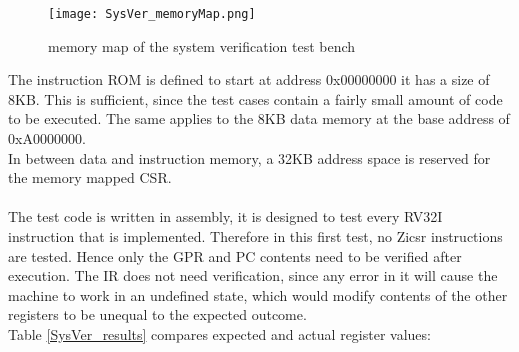 \begin{figure}[H]
	\centering
	\texttt{[image: SysVer\_memoryMap.png]}
	\caption{memory map of the system verification test bench}
	\label{fig:SysVerMM}
\end{figure}

The instruction \ac{ROM} is defined to start at address 0x00000000 it has a size of 8KB. This is sufficient, since the test cases contain a fairly small amount of code to be executed. The same applies to the 8KB data memory at the base address of 0xA0000000.\\
In between data and instruction memory, a 32KB address space is reserved for the memory mapped \ac{CSR}.\\
\\
The test code is written in assembly, it is designed to test every RV32I instruction that is implemented. Therefore in this first test, no Zicsr instructions are tested. Hence only the \ac{GPR} and \ac{PC} contents need to be verified after execution. The \ac{IR} does not need verification, since any error in it will cause the machine to work in an undefined state, which would modify contents of the other registers to be unequal to the expected outcome.\\
Table \ref{SysVer_results} compares expected and actual register values:

